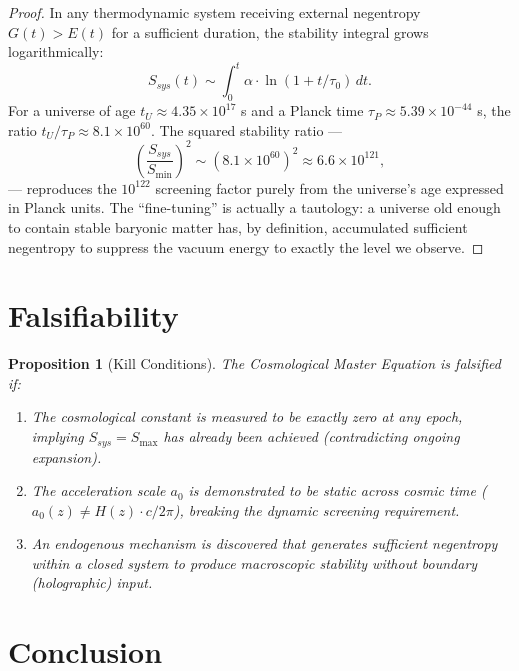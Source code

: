 \documentclass[12pt, a4paper]{article}
\theoremstyle{plain}
\newtheorem{proposition}[theorem]{Proposition}
\theoremstyle{definition}
\theoremstyle{remark}
\begin{document}
\begin{proof}
In any thermodynamic system receiving external negentropy $G(t) > E(t)$ for a sufficient duration, the stability integral grows logarithmically:
\begin{equation}
    S_{sys}(t) \sim \int_0^t \alpha \cdot \ln(1 + t/\tau_0) \, dt.
\end{equation}
For a universe of age $t_U \approx 4.35 \times 10^{17}$ s and a Planck time $\tau_P \approx 5.39 \times 10^{-44}$ s, the ratio $t_U / \tau_P \approx 8.1 \times 10^{60}$. The squared stability ratio ---
\begin{equation}
    \left(\frac{S_{sys}}{S_{\min}}\right)^2 \sim (8.1 \times 10^{60})^2 \approx 6.6 \times 10^{121},
\end{equation}
--- reproduces the $10^{122}$ screening factor purely from the universe's age expressed in Planck units. The ``fine-tuning'' is actually a tautology: a universe old enough to contain stable baryonic matter has, by definition, accumulated sufficient negentropy to suppress the vacuum energy to exactly the level we observe.
\end{proof}

\section{Falsifiability}\label{sec:falsifiability}

\begin{proposition}[Kill Conditions]
The Cosmological Master Equation is falsified if:
\begin{enumerate}
    \item The cosmological constant is measured to be exactly zero at any epoch, implying $S_{sys} = S_{\max}$ has already been achieved (contradicting ongoing expansion).
    \item The acceleration scale $a_0$ is demonstrated to be static across cosmic time ($a_0(z) \neq H(z) \cdot c / 2\pi$), breaking the dynamic screening requirement.
    \item An endogenous mechanism is discovered that generates sufficient negentropy within a closed system to produce macroscopic stability without boundary (holographic) input.
\end{enumerate}
\end{proposition}

\section{Conclusion}
\end{document}

